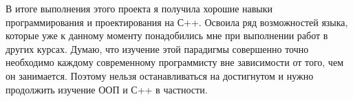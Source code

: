 В итоге выполнения этого проекта я получила хорошие навыки программирования и проектирования на С++. Освоила ряд возможностей языка, которые уже к данному моменту понадобились мне при выполнении работ в других курсах. Думаю, что изучение этой парадигмы совершенно точно необходимо каждому современному программисту вне зависимости от того, чем он занимается. Поэтому нельзя останавливаться на достигнутом и нужно продолжить изучение ООП и С++ в частности.
\pagebreak